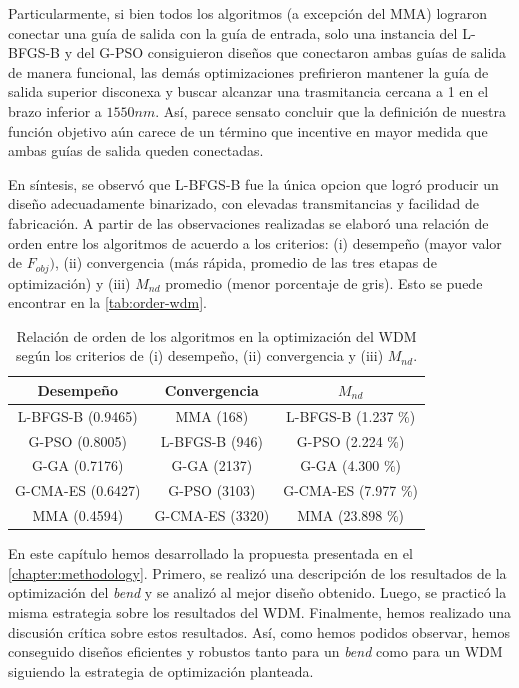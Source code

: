 Particularmente, si bien todos los algoritmos (a excepción del MMA) lograron conectar
una guía de salida con la guía de entrada, solo una instancia del L-BFGS-B y del G-PSO
consiguieron diseños que conectaron ambas guías de salida de manera funcional,
las demás optimizaciones prefirieron mantener la guía de salida superior disconexa
y buscar alcanzar una trasmitancia cercana a 1 en el brazo inferior a $1550 nm$.
Así, parece sensato concluir que la definición de nuestra función objetivo aún carece de un
término que incentive en mayor medida que ambas guías de salida queden conectadas.

En síntesis, se observó que L-BFGS-B fue la única opcion que logró
producir un diseño adecuadamente binarizado, con elevadas transmitancias y 
facilidad de fabricación.
A partir de las observaciones realizadas se elaboró una relación de orden entre los 
algoritmos de acuerdo a los criterios: 
(i) desempeño (mayor valor de $F_{obj})$, 
(ii) convergencia (más rápida, promedio de las tres etapas de optimización) y 
(iii) $M_{nd}$ promedio (menor porcentaje de gris).
Esto se puede encontrar en la \autoref{tab:order-wdm}.

\begin{table}[ht]
    \centering
    \begin{tabular}{|c|c|c|}
    \hline 
    Desempeño &  Convergencia & $M_{nd} $\\
    \hline 
      L-BFGS-B (0.9465) & MMA (168)      &  L-BFGS-B (1.237 \%) \\
      G-PSO (0.8005)    & L-BFGS-B (946) & G-PSO (2.224 \%) \\
      G-GA (0.7176)     & G-GA (2137)     & G-GA (4.300 \%) \\
      G-CMA-ES (0.6427) & G-PSO (3103)    & G-CMA-ES (7.977 \%) \\
      MMA (0.4594)      & G-CMA-ES (3320) & MMA (23.898 \%) \\
    \hline 
    \end{tabular}
    \caption{Relación de orden de los algoritmos en la optimización del WDM según
             los criterios de (i) desempeño, (ii) convergencia y (iii) $M_{nd}$.}
    \label{tab:order-wdm}
\end{table}

En este capítulo hemos desarrollado la propuesta presentada en el \autoref{chapter:methodology}.
Primero, se realizó una descripción de los resultados de la optimización del \emph{bend} y 
se analizó al mejor diseño obtenido. 
Luego, se practicó la misma estrategia sobre los resultados del WDM.
Finalmente, hemos realizado una discusión crítica sobre estos resultados.
Así, como hemos podidos observar, hemos conseguido diseños eficientes y robustos tanto para un \emph{bend}
como para un WDM siguiendo la estrategia de optimización planteada.
